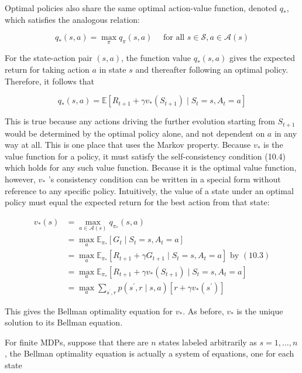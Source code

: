 \documentclass[11pt]{article}
\theoremstyle{plain} %
\theoremstyle{remark}
\begin{document}
  {\color{C3}Optimal policies also share the same optimal action-value function},
denoted $q_{*}$, which satisfies the analogous relation:

$$
  q_{*}(s, a)=\max _{\pi} q_{\pi}(s, a) \quad \text { for all } s \in \mathcal{S}, a \in \mathcal{A}(s)
$$

For the state-action pair $(s, a)$, the function value $q_{*}(s, a)$
gives the expected return for taking action $a$ in state $s$ and thereafter
following an optimal policy. Therefore, it follows that

$$
  q_{*}(s, a)=\mathbb{E}\left[R_{t+1}+\gamma v_{*}\left(S_{t+1}\right) \mid S_{t}=s, A_{t}=a\right]
$$

This is true because any actions driving the further evolution starting
from $S_{t+1}$ would be determined by the optimal policy alone, and not
dependent on $a$ in any way at all. This is one place that uses the Markov property. Because $v_{*}$ is the value function for a policy, it must satisfy the
self-consistency condition (10.4) which holds for any such value function. Because it is the optimal value function, however, $v_{*}$ 's
consistency condition can be written in a special form without reference to
any specific policy. Intuitively, the value of a state under an optimal policy must equal the
expected return for the best action from that state:

$$
  \begin{aligned}
    v_{*}(s) & =\max _{a \in \mathcal{A}(s)} q_{\pi_{*}}(s, a)                                                                         \\
             & =\max _{a} \mathbb{E}_{\pi_{*}}\left[G_{t} \mid S_{t}=s, A_{t}=a\right]                                                 \\
             & =\max _{a} \mathbb{E}_{\pi_{*}}\left[R_{t+1}+\gamma G_{t+1} \mid S_{t}=s, A_{t}=a\right] \text { by }(10.3)             \\
             & =\max _{a} \mathbb{E}_{\pi_{*}}\left[R_{t+1}+\gamma v_{*}\left(S_{t+1}\right) \mid S_{t}=s, A_{t}=a\right]              \\
             & =\max _{a} \sum_{s^{\prime}, r} p\left(s^{\prime}, r \mid s, a\right)\left[r+\gamma v_{*}\left(s^{\prime}\right)\right]
  \end{aligned}
$$

This gives the Bellman optimality equation for $v_{*}$. As before, $v_{*}$ is the unique solution to its Bellman equation.

For finite MDPs, suppose that there are $n$ states labeled arbitrarily
as $s=1, \ldots, n$, the Bellman optimality equation is actually a system of equations, one
for each state
\end{document}
